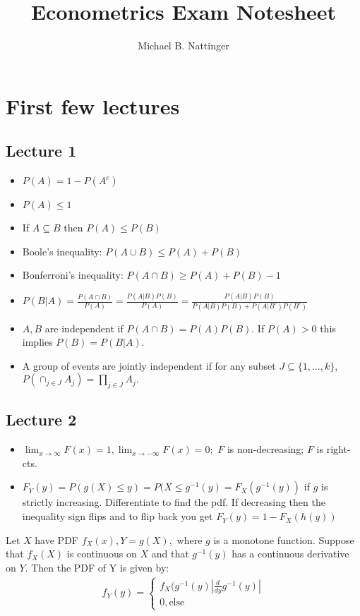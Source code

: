 \documentclass[11pt]{article} %
\title{Econometrics Exam Notesheet}
\author{Michael B. Nattinger}
\begin{document}
\maketitle
\section{First few lectures}
\subsection{Lecture 1}
\begin{itemize}
\item $P(A) = 1 - P(A^c)$
\item $P(A) \leq 1$
\item If $A \subseteq B$ then $P(A) \leq P(B)$
\item Boole's inequality: $P(A \cup B) \leq P(A) + P(B)$
\item Bonferroni's inequality: $P(A\cap B) \geq P(A) + P(B) - 1$
\item $P(B|A) = \frac{P(A \cap B)}{P(A)} = \frac{P(A|B)P(B)}{P(A)} = \frac{P(A|B)P(B)}{P(A|B)P(B) + P(A|B^c)P(B^c)}$
\item $A,B$ are independent if $P(A \cap B) = P(A)P(B)$. If $P(A)>0$ this implies $P(B) = P(B|A).$
\item A group of events are jointly independent if for any subset $J\subseteq \{ 1,\dots,k\}$, $P(\cap_{j \in J}A_j) = \prod_{j\in J}A_j.$
\end{itemize}
\subsection{Lecture 2}
\begin{itemize}
\item $\lim_{x \rightarrow \infty}F(x) = 1, \lim_{x \rightarrow -\infty}F(x) = 0; $ $F$ is non-decreasing; $F$ is right-cts.
\item $F_Y(y) = P(g(X) \leq y) = P(X \leq g^{-1}(y) = F_X(g^{-1}(y))$ if $g$ is strictly increasing. Differentiate to find the pdf. If decreasing then the inequality sign flips and to flip back you get $F_{Y}(y)= 1 -F_X(h(y))$
\end{itemize}
Let $X$ have PDF $f_X(x), Y = g(X),$ where $g$ is a monotone function. Suppose that $f_X(X)$ is continuous on $X$ and that $g^{-1}(y)$ has a continuous derivative on $Y$. Then the PDF of Y is given by:
\begin{align*}
f_Y(y) = \begin{cases} f_X(g^{-1}(y)|\frac{d}{dy}g^{-1}(y)|\\ 0, \text{else}\end{cases}
\end{align*}
\end{document}
